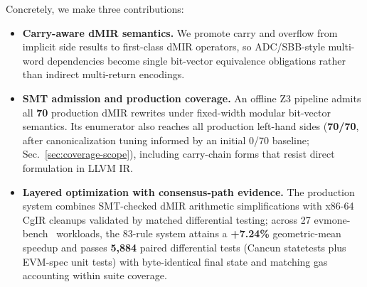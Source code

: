 Concretely, we make three contributions:
\begin{itemize}
\item \textbf{Carry-aware dMIR semantics.} We promote carry and overflow
from implicit side results to first-class dMIR operators, so
ADC/SBB-style multi-word dependencies become single bit-vector
equivalence obligations rather than indirect multi-return encodings.
\item \textbf{SMT admission and production coverage.} An offline Z3
pipeline admits all \textbf{70} production dMIR rewrites under
fixed-width modular bit-vector semantics. Its enumerator also reaches
all production left-hand sides (\textbf{70/70}, after canonicalization
tuning informed by an initial 0/70 baseline; Sec.~\ref{sec:coverage-scope}),
including carry-chain forms that resist direct formulation in LLVM IR.
\item \textbf{Layered optimization with consensus-path evidence.}
The production system combines SMT-checked dMIR arithmetic
simplifications with x86-64 CgIR cleanups validated by matched
differential testing; across 27 evmone-bench~\cite{evmone} workloads,
the 83-rule system attains a \textbf{+7.24\%} geometric-mean speedup
and passes \textbf{5{,}884} paired differential tests (Cancun statetests
plus EVM-spec unit tests) with byte-identical final state and matching
gas accounting within suite coverage.
\end{itemize}
